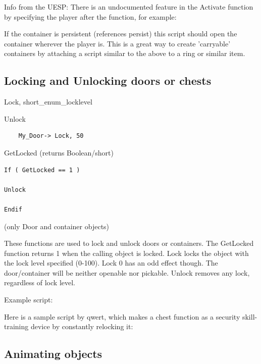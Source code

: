 Info from the UESP: There is an undocumented feature in the Activate
function by specifying the player after the function, for example:



If the container is persistent (references persist) this script should
open the container wherever the player is. This is a great way to create
'carryable' containers by attaching a script similar to the above to a
ring or similar item.

\hypertarget{locking-and-unlocking-doors-or-chests}{%
\subsection{\texorpdfstring{\hfill\break
Locking and Unlocking doors or
chests}{ Locking and Unlocking doors or chests}}\label{locking-and-unlocking-doors-or-chests}}

Lock, short\_enum\_locklevel

Unlock

\begin{lstlisting}
	My_Door-> Lock, 50
\end{lstlisting}

GetLocked (returns Boolean/short)

\begin{lstlisting}
If ( GetLocked == 1 )

Unlock

Endif
\end{lstlisting}

(only Door and container objects)

These functions are used to lock and unlock doors or containers. The
GetLocked function returns 1 when the calling object is locked. Lock
locks the object with the lock level specified (0-100). Lock 0 has an
odd effect though. The door/container will be neither openable nor
pickable. Unlock removes any lock, regardless of lock level.

Example script:

Here is a sample script by qwert, which makes a chest function as a
security skill-training device by constantly relocking it:



\hypertarget{animating-objects}{%
\subsection{Animating objects}\label{animating-objects}}

